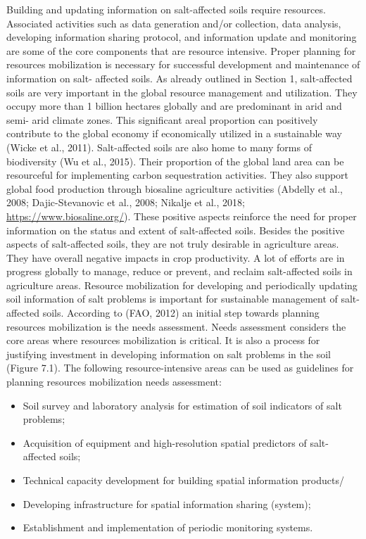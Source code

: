 \documentclass[
  10pt,
  b5paper,
]{book}
\providecommand{\tightlist}{%
  \setlength{\itemsep}{0pt}\setlength{\parskip}{0pt}}
\begin{document}
Building and updating information on salt-affected soils require resources. Associated activities such as data generation and/or collection, data analysis, developing information sharing protocol, and information update and monitoring are some of the core components that are resource intensive. Proper planning for resources mobilization is necessary for successful development and maintenance of information on salt- affected soils.
As already outlined in Section 1, salt-affected soils are very important in the global resource management and utilization. They occupy more than 1 billion hectares globally and are predominant in arid and semi- arid climate zones. This significant areal proportion can positively contribute to the global economy if economically utilized in a sustainable way (Wicke et al., 2011). Salt-affected soils are also home to many forms of biodiversity (Wu et al., 2015). Their proportion of the global land area can be resourceful for implementing carbon sequestration activities. They also support global food production through biosaline agriculture activities (Abdelly et al., 2008; Dajic-Stevanovic et al., 2008; Nikalje et al., 2018; \url{https://www.biosaline.org/}). These positive aspects reinforce the need for proper information on the status and extent of salt-affected soils. Besides the positive aspects of salt-affected soils, they are not truly desirable in agriculture areas. They have overall negative impacts in crop productivity. A lot of efforts are in progress globally to manage, reduce or prevent, and reclaim salt-affected soils in agriculture areas.
Resource mobilization for developing and periodically updating soil information of salt problems is important for sustainable management of salt-affected soils. According to (FAO, 2012) an initial step towards planning resources mobilization is the needs assessment. Needs assessment considers the core areas where resources mobilization is critical. It is also a process for justifying investment in developing information on salt problems in the soil (Figure 7.1). The following resource-intensive areas can be used as guidelines for planning resources mobilization needs assessment:

\begin{itemize}
\tightlist
\item
  Soil survey and laboratory analysis for estimation of soil indicators of salt problems;
\item
  Acquisition of equipment and high-resolution spatial predictors of salt-affected soils;
\item
  Technical capacity development for building spatial information products/
\item
  Developing infrastructure for spatial information sharing (system);
\item
  Establishment and implementation of periodic monitoring systems.
\end{itemize}
\end{document}

